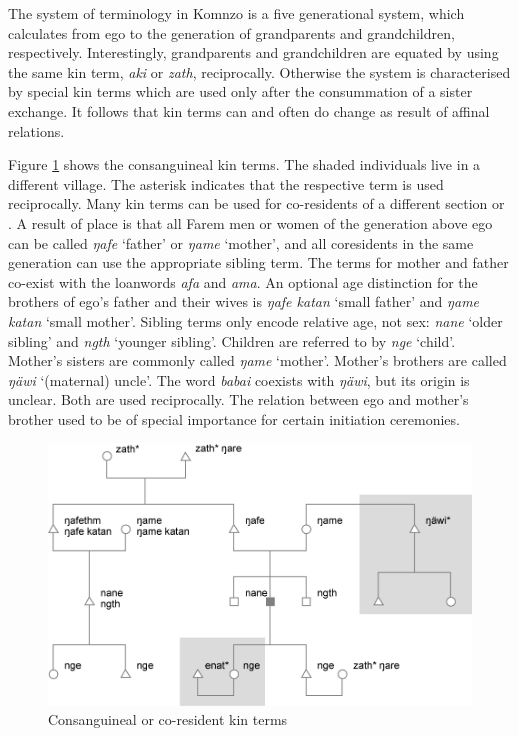 The system of  terminology in Komnzo is a five generational system, which calculates from ego to the generation of grandparents and grandchildren, respectively. Interestingly, grandparents and grandchildren are equated by using the same kin term, \emph{aki} or \emph{zath}, reciprocally. Otherwise the system is characterised by special kin terms which are used only after the consummation of a sister exchange. It follows that kin terms can and often do change as result of affinal relations.

Figure \ref{fig:kinship1} shows the consanguineal kin terms. The shaded individuals live in a different village. The asterisk indicates that the respective term is used reciprocally. Many kin terms can be used for co-residents of a different section or . A result of place  is that all Farem men or women of the generation above ego can be called \emph{ŋafe} `father' or \emph{ŋame} `mother', and all coresidents in the same generation can use the appropriate sibling term. The terms for mother and father co-exist with the  loanwords \emph{afa} and \emph{ama}. An optional age distinction for the brothers of ego's father and their wives is \emph{ŋafe katan} `small father' and \emph{ŋame katan} `small mother'. Sibling terms only encode relative age, not sex: \emph{nane} `older sibling' and \emph{ngth} `younger sibling'. Children are referred to by \emph{nge} `child'. Mother's sisters are commonly called \emph{ŋame} `mother'. Mother's brothers are called \emph{ŋäwi} `(maternal) uncle'. The word \emph{babai} coexists with \emph{ŋäwi}, but its origin is unclear. Both are used reciprocally. The relation between ego and mother's brother used to be of special importance for certain initiation ceremonies.

\begin{figure}
	\includegraphics[width=12cm]{figures/kinship1.png}
	\caption[Consanguineal or co-resident kin terms]{Consanguineal or co-resident kin terms}
	\label{fig:kinship1}
\end{figure}%

